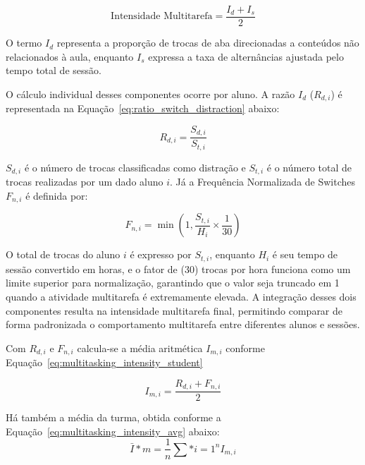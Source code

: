 \begin{equation}\label{eq:multitasking_intensity}
\text{Intensidade Multitarefa} = \frac{I_d + I_s}{2}
\end{equation}

O termo $I_d$ representa a proporção de trocas de aba direcionadas a conteúdos não relacionados à aula, enquanto $I_s$ expressa a taxa de alternâncias ajustada pelo tempo total de sessão.

O cálculo individual desses componentes ocorre por aluno. A razão $I_d$ ($R_{d,i}$) é representada na Equação~\ref{eq:ratio_switch_distraction} abaixo:

\begin{equation}\label{eq:ratio_switch_distraction}
R_{d,i} = \frac{S_{d,i}}{S_{t,i}}
\end{equation}

$S_{d,i}$ é o número de trocas classificadas como distração e $S_{t,i}$ é o número total de trocas realizadas por um dado aluno $i$. Já a Frequência Normalizada de Switches $F_{n,i}$ é definida por:

\begin{equation}\label{eq:normalized_switch_frequency}
F_{n,i} = \min\left(1, \frac{S_{t,i}}{H_i} \times \frac{1}{30}\right)
\end{equation}

 O total de trocas do aluno $i$ é expresso por $S_{t,i}$, enquanto $H_i$ é seu tempo de sessão convertido em horas, e o fator de (30) trocas por hora funciona como um limite superior para normalização, garantindo que o valor seja truncado em 1 quando a atividade multitarefa é extremamente elevada. A integração desses dois componentes resulta na intensidade multitarefa final, permitindo comparar de forma padronizada o comportamento multitarefa entre diferentes alunos e sessões.

Com $R_{d,i}$ e $F_{n,i}$ calcula-se a média aritmética $I_{m,i}$ conforme Equação~\ref{eq:multitasking_intensity_student}

\begin{equation}\label{eq:multitasking_intensity_student}
I_{m,i} = \frac{R_{d,i} + F_{n,i}}{2}
\end{equation}

Há também a média da turma, obtida conforme a Equação~\ref{eq:multitasking_intensity_avg} abaixo:
\begin{equation}\label{eq:multitasking_intensity_avg}
\bar{I}*m = \frac{1}{n} \sum*{i=1}^{n} I_{m,i}
\end{equation}

